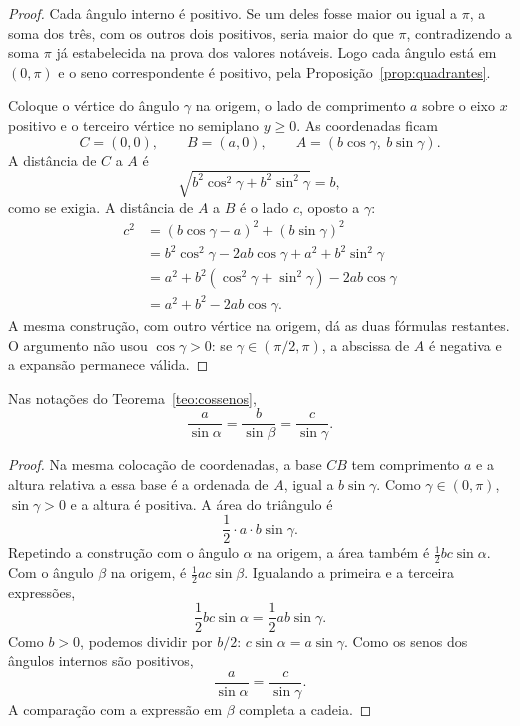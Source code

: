 \documentclass[11pt,a4paper]{article}
\begin{document}
\begin{proof}
Cada ângulo interno é positivo. Se um deles fosse maior ou igual a $\pi$, a soma dos três, com os outros dois positivos, seria maior do que $\pi$, contradizendo a soma $\pi$ já estabelecida na prova dos valores notáveis. Logo cada ângulo está em $(0,\pi)$ e o seno correspondente é positivo, pela Proposição~\ref{prop:quadrantes}.

Coloque o vértice do ângulo $\gamma$ na origem, o lado de comprimento $a$ sobre o eixo $x$ positivo e o terceiro vértice no semiplano $y\ge 0$. As coordenadas ficam
\[
C=(0,0),\qquad B=(a,0),\qquad A=(b\cos\gamma,\ b\sin\gamma).
\]
A distância de $C$ a $A$ é
\[
\sqrt{b^2\cos^2\gamma+b^2\sin^2\gamma}=b,
\]
como se exigia. A distância de $A$ a $B$ é o lado $c$, oposto a $\gamma$:
\begin{align*}
c^2
&=(b\cos\gamma-a)^2+(b\sin\gamma)^2\\
&=b^2\cos^2\gamma-2ab\cos\gamma+a^2+b^2\sin^2\gamma\\
&=a^2+b^2(\cos^2\gamma+\sin^2\gamma)-2ab\cos\gamma\\
&=a^2+b^2-2ab\cos\gamma.
\end{align*}
A mesma construção, com outro vértice na origem, dá as duas fórmulas restantes. O argumento não usou $\cos\gamma>0$: se $\gamma\in(\pi/2,\pi)$, a abscissa de $A$ é negativa e a expansão permanece válida.
\end{proof}

\begin{teorema}\label{teo:senos}
Nas notações do Teorema~\ref{teo:cossenos},
\[
\frac{a}{\sin\alpha}=\frac{b}{\sin\beta}=\frac{c}{\sin\gamma}.
\]
\end{teorema}

\begin{proof}
Na mesma colocação de coordenadas, a base $CB$ tem comprimento $a$ e a altura relativa a essa base é a ordenada de $A$, igual a $b\sin\gamma$. Como $\gamma\in(0,\pi)$, $\sin\gamma>0$ e a altura é positiva. A área do triângulo é
\[
\frac12\cdot a\cdot b\sin\gamma.
\]
Repetindo a construção com o ângulo $\alpha$ na origem, a área também é $\frac12 bc\sin\alpha$. Com o ângulo $\beta$ na origem, é $\frac12 ac\sin\beta$. Igualando a primeira e a terceira expressões,
\[
\frac12 bc\sin\alpha=\frac12 ab\sin\gamma.
\]
Como $b>0$, podemos dividir por $b/2$: $c\sin\alpha=a\sin\gamma$. Como os senos dos ângulos internos são positivos, 
\[
\frac{a}{\sin\alpha}=\frac{c}{\sin\gamma}.
\]
A comparação com a expressão em $\beta$ completa a cadeia.
\end{proof}
\end{document}
